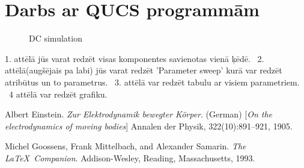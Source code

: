 \documentclass{report}
\begin{document}
\section{Darbs ar QUCS programmām}
\begin{figure}[h]
    \centering
{}
    \caption{DC simulation}
    \label{3}
\end{figure}
1. attēlā jūs varat redzēt visas komponentes savienotas vienā ķēdē. \ 
2. attēlā(augšējais pa labi) jūs varat redzēt 'Parameter sweep' kurā var redzēt atribūtus un to parametrus. \
3. attēlā var redzēt tabulu ar visiem parametriem. \ 
4 attēlā var redzēt grafiku. \ 


\begin{thebibliography}{9}
Albert Einstein. 
\textit{Zur Elektrodynamik bewegter K{\"o}rper}. (German) 
[\textit{On the electrodynamics of moving bodies}]
Annalen der Physik, 322(10):891–921, 1905.

\bibitem{2.} 
Michel Goossens, Frank Mittelbach, and Alexander Samarin. 
\textit{The \LaTeX\ Companion}. 
Addison-Wesley, Reading, Massachusetts, 1993.
\end{thebibliography}
\end{document}
